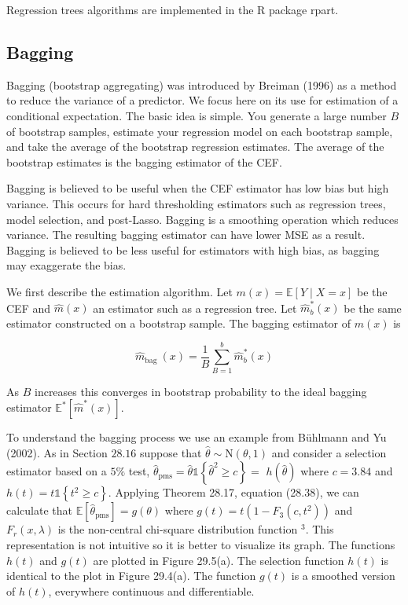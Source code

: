 \documentclass[10pt]{article}
\begin{document}
Regression trees algorithms are implemented in the R package rpart.

\subsection{Bagging}
Bagging (bootstrap aggregating) was introduced by Breiman (1996) as a method to reduce the variance of a predictor. We focus here on its use for estimation of a conditional expectation. The basic idea is simple. You generate a large number $B$ of bootstrap samples, estimate your regression model on each bootstrap sample, and take the average of the bootstrap regression estimates. The average of the bootstrap estimates is the bagging estimator of the CEF.

Bagging is believed to be useful when the CEF estimator has low bias but high variance. This occurs for hard thresholding estimators such as regression trees, model selection, and post-Lasso. Bagging is a smoothing operation which reduces variance. The resulting bagging estimator can have lower MSE as a result. Bagging is believed to be less useful for estimators with high bias, as bagging may exaggerate the bias.

We first describe the estimation algorithm. Let $m(x)=\mathbb{E}[Y \mid X=x]$ be the CEF and $\widehat{m}(x)$ an estimator such as a regression tree. Let $\widehat{m}_{b}^{*}(x)$ be the same estimator constructed on a bootstrap sample. The bagging estimator of $m(x)$ is

$$
\widehat{m}_{\text {bag }}(x)=\frac{1}{B} \sum_{B=1}^{b} \widehat{m}_{b}^{*}(x)
$$

As $B$ increases this converges in bootstrap probability to the ideal bagging estimator $\mathbb{E}^{*}\left[\widehat{m}^{*}(x)\right]$.

To understand the bagging process we use an example from Bühlmann and Yu (2002). As in Section $28.16$ suppose that $\widehat{\theta} \sim \mathrm{N}(\theta, 1)$ and consider a selection estimator based on a $5 \%$ test, $\widehat{\theta}_{\mathrm{pms}}=\widehat{\theta} \mathbb{1}\left\{\widehat{\theta}^{2} \geq c\right\}=$ $h(\widehat{\theta})$ where $c=3.84$ and $h(t)=t \mathbb{1}\left\{t^{2} \geq c\right\}$. Applying Theorem 28.17, equation (28.38), we can calculate that $\mathbb{E}\left[\widehat{\theta}_{\mathrm{pms}}\right]=g(\theta)$ where $g(t)=t\left(1-F_{3}\left(c, t^{2}\right)\right)$ and $F_{r}(x, \lambda)$ is the non-central chi-square distribution function ${ }^{3}$. This representation is not intuitive so it is better to visualize its graph. The functions $h(t)$ and $g(t)$ are plotted in Figure 29.5(a). The selection function $h(t)$ is identical to the plot in Figure 29.4(a). The function $g(t)$ is a smoothed version of $h(t)$, everywhere continuous and differentiable.
\end{document}
